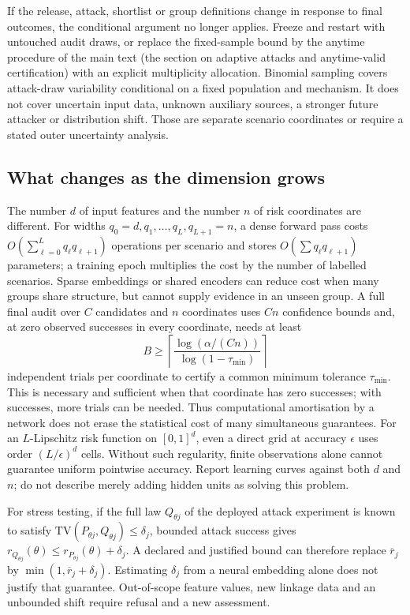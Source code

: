 If the release, attack, shortlist or group definitions change in response to
final outcomes, the conditional argument no longer applies. Freeze and restart
with untouched audit draws, or replace the fixed-sample bound by the anytime
procedure of the main text (the section on adaptive attacks and anytime-valid certification) with an explicit multiplicity
allocation. Binomial sampling covers attack-draw variability conditional on a
fixed population and mechanism. It does not cover uncertain input data, unknown
auxiliary sources, a stronger future attacker or distribution shift. Those are
separate scenario coordinates or require a stated outer uncertainty analysis.

\subsection{What changes as the dimension grows}

The number $d$ of input features and the number $n$ of risk coordinates are
different. For widths $q_0=d,q_1,\ldots,q_L,q_{L+1}=n$, a dense forward pass
costs $O(\sum_{\ell=0}^{L}q_\ell q_{\ell+1})$ operations per scenario and
stores $O(\sum q_\ell q_{\ell+1})$ parameters; a training epoch multiplies
the cost by the number of labelled scenarios. Sparse embeddings or shared
encoders can reduce cost when many groups share structure, but cannot supply
evidence in an unseen group. A full final audit over $C$ candidates and $n$
coordinates uses $Cn$ confidence bounds and, at zero observed successes in
every coordinate, needs at least
\begin{equation}
 B\geq\left\lceil\frac{\log(\alpha/(Cn))}{\log(1-\tau_{
 \min})}\right\rceil\label{eq:neural-budget}
\end{equation}
independent trials per coordinate to certify a common minimum tolerance
$\tau_{\min}$. This is necessary and sufficient when that coordinate has
zero successes; with successes, more trials can be needed. Thus computational
amortisation by a network
does not erase the statistical cost of many simultaneous guarantees.
For an $L$-Lipschitz risk function on $[0,1]^d$, even a direct grid at
accuracy $\epsilon$ uses order $(L/\epsilon)^d$ cells. Without such
regularity, finite observations alone cannot guarantee uniform pointwise
accuracy. Report learning curves against both $d$
and $n$; do not describe merely adding hidden units as solving this problem.

For stress testing, if the full law $Q_{\theta j}$ of the deployed attack
experiment is known to satisfy
$\mathrm{TV}(P_{\theta j},Q_{\theta j})\leq\delta_j$,
bounded attack success gives
$r_{Q_{\theta j}}(\theta)\leq r_{P_{\theta j}}(\theta)+\delta_j$.
A declared and justified
bound can therefore replace $\overline r_j$ by
$\min(1,\overline r_j+\delta_j)$. Estimating $\delta_j$ from a neural
embedding alone does not justify that guarantee. Out-of-scope feature values,
new linkage data and an unbounded shift require refusal and a new assessment.


